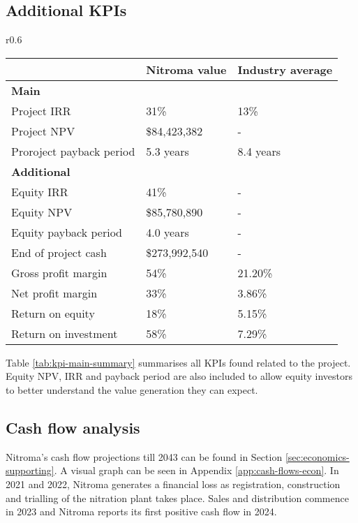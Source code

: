 \subsection{Additional KPIs}
    \begin{wraptable}{r}{0.6\linewidth}
    \centering
        \caption{Summary of Nitroma's KPIs and industry averages (damodaran,outlookmoney)}
        \label{tab:kpi-main-summary}
    \begin{tabular}{@{}lll@{}}
    \toprule
                             & Nitroma value & Industry average \\ \midrule
    \textbf{Main}            &               &                  \\
    Project IRR              & 31\%          & 13\%             \\
    Project NPV              & \$84,423,382  & -                \\
    Proroject payback period & 5.3 years     & 8.4 years        \\
    \textbf{Additional}      &               &                  \\
    Equity IRR               & 41\%          & -                \\
    Equity NPV               & \$85,780,890  & -                \\
    Equity payback period    & 4.0 years     & -                \\
    End of project cash      & \$273,992,540 & -                \\
    Gross profit margin      & 54\%          & 21.20\%          \\
    Net profit margin        & 33\%          & 3.86\%           \\
    Return on equity         & 18\%          & 5.15\%           \\
    Return on investment     & 58\%          & 7.29\%           \\ \bottomrule
    \end{tabular}
    \end{wraptable}
Table \ref{tab:kpi-main-summary} summarises all KPIs found related to the project. Equity NPV, IRR and payback period are also included to allow equity investors to better understand the value generation they can expect. 


\subsection{Cash flow analysis}
\label{sec:cash-flows}
Nitroma’s cash flow projections till 2043 can be found in Section \ref{sec:economics-supporting}. A visual graph can be seen in Appendix \ref{app:cash-flows-econ}. In 2021 and 2022, Nitroma generates a financial loss as registration, construction and trialling of the nitration plant takes place. Sales and distribution commence in 2023 and Nitroma reports its first positive cash flow in 2024. 

